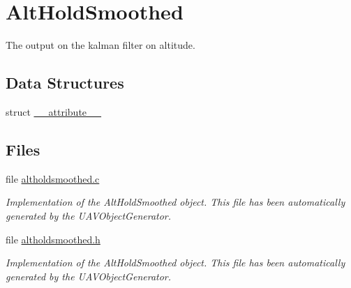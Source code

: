 \hypertarget{group___alt_hold_smoothed}{\section{\-Alt\-Hold\-Smoothed}
\label{group___alt_hold_smoothed}
}


\-The output on the kalman filter on altitude.  


\subsection*{\-Data \-Structures}
\begin{DoxyCompactItemize}
\item 
struct \hyperlink{struct____attribute____}{\-\_\-\-\_\-attribute\-\_\-\-\_\-}
\end{DoxyCompactItemize}
\subsection*{\-Files}
\begin{DoxyCompactItemize}
\item 
file \hyperlink{altholdsmoothed_8c}{altholdsmoothed.\-c}
\begin{DoxyCompactList}\small\item\em \-Implementation of the \-Alt\-Hold\-Smoothed object. \-This file has been automatically generated by the \-U\-A\-V\-Object\-Generator. \end{DoxyCompactList}\item 
file \hyperlink{altholdsmoothed_8h}{altholdsmoothed.\-h}
\begin{DoxyCompactList}\small\item\em \-Implementation of the \-Alt\-Hold\-Smoothed object. \-This file has been automatically generated by the \-U\-A\-V\-Object\-Generator. \end{DoxyCompactList}\end{DoxyCompactItemize}
